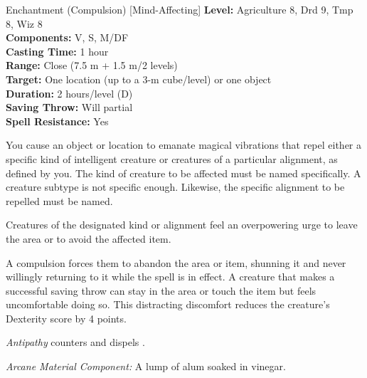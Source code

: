 {Enchantment (Compulsion) [Mind-Affecting]}
{
	\textbf{Level:}
	Agriculture 8, Drd 9, Tmp 8, Wiz 8\\
	\textbf{Components:}
	V, S, M/DF\\
	\textbf{Casting Time:}
	1 hour\\
	\textbf{Range:}
	Close (7.5 m + 1.5 m/2 levels)\\
	\textbf{Target:}
	One location (up to a 3-m cube/level) or one object\\
	\textbf{Duration:}
	2 hours/level (D)\\
	\textbf{Saving Throw:}
	Will partial\\
	\textbf{Spell Resistance:}
	Yes\\
}
{
	You cause an object or location to emanate magical vibrations that repel either a specific kind of intelligent creature or creatures of a particular alignment, as defined by you. The kind of creature to be affected must be named specifically. A creature subtype is not specific enough. Likewise, the specific alignment to be repelled must be named.

	Creatures of the designated kind or alignment feel an overpowering urge to leave the area or to avoid the affected item.

	A compulsion forces them to abandon the area or item, shunning it and never willingly returning to it while the spell is in effect. A creature that makes a successful saving throw can stay in the area or touch the item but feels uncomfortable doing so. This distracting discomfort reduces the creature's Dexterity score by 4 points.

	\emph{Antipathy} counters and dispels .

	\textit{Arcane Material Component:}
	A lump of alum soaked in vinegar.

}

